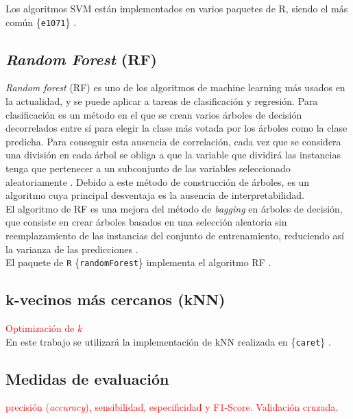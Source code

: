 Los algoritmos SVM están implementados en varios paquetes de R, siendo el más común \{\texttt{e1071}\} \cite{Meyer2019}.

\subsection{\textit{Random Forest} (RF)}

\textit{Random forest} (RF) es uno de los algoritmos de machine learning más usados en la actualidad, y se puede aplicar a tareas de clasificación y regresión. Para clasificación es un método en el que se crean varios árboles de decisión decorrelados entre sí para elegir la clase más votada por los árboles como la clase predicha. Para conseguir esta ausencia de correlación, cada vez que se considera una división en cada árbol se obliga a que la variable que dividirá las instancias tenga que pertenecer a un subconjunto de las variables seleccionado aleatoriamente \cite{Breiman2001, Breiman2002}. Debido a este método de construcción de árboles, es un algoritmo cuya principal desventaja es la ausencia de interpretabilidad.\\

El algoritmo de RF es una mejora del método de \textit{bagging} en árboles de decisión, que consiste en crear árboles basados en una selección aleatoria sin reemplazamiento de las instancias del conjunto de entrenamiento, reduciendo así la varianza de las predicciones \cite{Breiman1996}.\\

El paquete de \texttt{R} \{\texttt{randomForest}\} implementa el algoritmo RF \cite{Liaw2002}.

\subsection{k-vecinos más cercanos (kNN)}

\textcolor{red}{Optimización de $k$}\\

En este trabajo se utilizará la implementación de kNN realizada en \{\texttt{caret}\} \cite{Kuhn2020}.

\subsection{Medidas de evaluación}

\textcolor{red}{precisión (\textit{accuracy}), sensibilidad, especificidad y F1-Score. Validación cruzada.}
